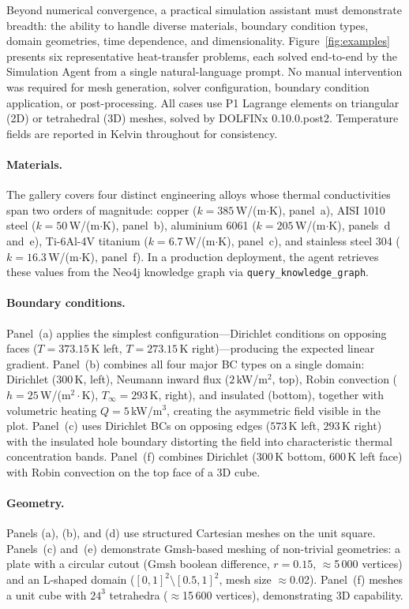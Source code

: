 \documentclass[twocolumn]{article}
\begin{document}
Beyond numerical convergence, a practical simulation assistant must
demonstrate breadth: the ability to handle diverse materials, boundary
condition types, domain geometries, time dependence, and dimensionality.
Figure~\ref{fig:examples} presents six representative heat-transfer
problems, each solved end-to-end by the Simulation Agent from a single
natural-language prompt.  No manual intervention was required for mesh
generation, solver configuration, boundary condition application, or
post-processing.  All cases use P1 Lagrange elements on triangular
(2D) or tetrahedral (3D) meshes, solved by DOLFINx 0.10.0.post2.
Temperature fields are reported in Kelvin throughout for consistency.

\paragraph{Materials.}
The gallery covers four distinct engineering alloys whose thermal
conductivities span two orders of magnitude:
copper ($k=385$\,W/(m$\cdot$K), panel~a),
AISI 1010 steel ($k=50$\,W/(m$\cdot$K), panel~b),
aluminium 6061 ($k=205$\,W/(m$\cdot$K), panels~d and~e),
Ti-6Al-4V titanium ($k=6.7$\,W/(m$\cdot$K), panel~c),
and stainless steel 304 ($k=16.3$\,W/(m$\cdot$K), panel~f).
In a production deployment, the agent retrieves these values from the
Neo4j knowledge graph via \texttt{query\_knowledge\_graph}.

\paragraph{Boundary conditions.}
Panel~(a) applies the simplest configuration---Dirichlet conditions on
opposing faces ($T=373.15$\,K left, $T=273.15$\,K right)---producing
the expected linear gradient.  Panel~(b) combines all four major
BC types on a single domain: Dirichlet ($300$\,K, left), Neumann
inward flux ($2$\,kW/m$^2$, top), Robin convection ($h=25$\,W/(m$^2
\cdot$K), $T_\infty=293$\,K, right), and insulated (bottom), together
with volumetric heating $Q=5$\,kW/m$^3$, creating the asymmetric
field visible in the plot.  Panel~(c) uses Dirichlet BCs on opposing
edges ($573$\,K left, $293$\,K right) with the insulated hole boundary
distorting the field into characteristic thermal concentration bands.
Panel~(f) combines Dirichlet ($300$\,K bottom, $600$\,K left face)
with Robin convection on the top face of a 3D cube.

\paragraph{Geometry.}
Panels (a), (b), and (d) use structured Cartesian meshes on the
unit square.  Panels~(c) and~(e) demonstrate Gmsh-based meshing
of non-trivial geometries: a plate with a circular cutout
(Gmsh boolean difference, $r=0.15$, $\approx$5\,000 vertices) and
an L-shaped domain ($[0,1]^2 \setminus [0.5,1]^2$, mesh size
$\approx$0.02).  Panel~(f) meshes a unit cube with $24^3$
tetrahedra ($\approx$15\,600 vertices), demonstrating 3D capability.
\end{document}

